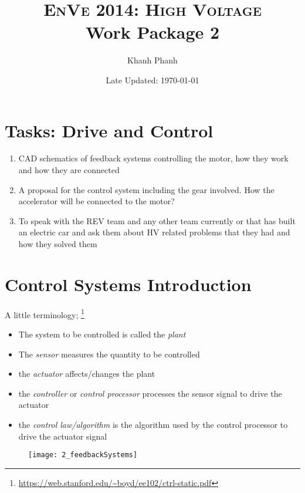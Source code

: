 \documentclass[a4paper]{article}
\title{\textsc{EnVe 2014: High Voltage} \\ \textbf{Work Package 2}}
\author{Khanh Phanh}
\date{Late Updated: \today}
\begin{document}
\pagestyle{fancy} \lhead{} \rhead{}
\maketitle
\tableofcontents

\section{Tasks: Drive and Control}
    \begin{enumerate}
        \item CAD schematics of feedback systems controlling the motor, how they
        work and how they are connected

        \item A proposal for the control system including the gear involved.
        How the accelerator will be connected to the motor?

        \item To speak with the REV team and any other team currently or that has
        built an electric car and ask them about HV related problems that they had
        and how they solved them
    \end{enumerate}

\section{Control Systems Introduction}
    A little terminology;
        \footnote{\url{https://web.stanford.edu/~boyd/ee102/ctrl-static.pdf}}
        \begin{itemize}
        \item The system to be controlled is called the \textit{plant}
        \item The \textit{sensor} measures the quantity to be controlled
        \item the \textit{actuator} affects/changes the plant
        \item the \textit{controller} or \textit{control processor} processes the
        sensor signal to drive the actuator
        \item the \textit{control law/algorithm} is the algorithm used by the
        control processor to drive the actuator signal
        \end{itemize}

    \begin{figure}
        \centering
        \texttt{[image: 2\_feedbackSystems]}
    \end{figure}
\end{document}
